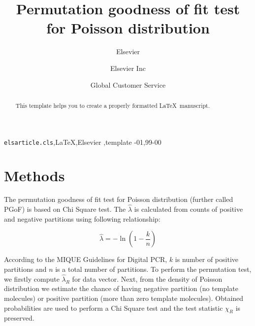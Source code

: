 \documentclass[review]{elsarticle}
\begin{document}
\begin{frontmatter}

\title{Permutation goodness of fit test for Poisson distribution}

\author{Elsevier}
\address{Radarweg 29, Amsterdam}

\author[mymainaddress,mysecondaryaddress]{Elsevier Inc}

\author[mysecondaryaddress]{Global Customer Service}

\address[mymainaddress]{1600 John F Kennedy Boulevard, Philadelphia}
\address[mysecondaryaddress]{360 Park Avenue South, New York}

\begin{abstract}
This template helps you to create a properly formatted \LaTeX\ manuscript.
\end{abstract}

\begin{keyword}
\texttt{elsarticle.cls}\sep \LaTeX\sep Elsevier \sep template
-01\sep  99-00
\end{keyword}

\end{frontmatter}

\linenumbers


\section{Methods}

The permutation goodness of fit test for Poisson distribution (further called PGoF) is based on Chi Square test. The $\hat\lambda$ is calculated from counts of positive and negative partitions using following relationship:

\begin{equation}
\hat{\lambda} = - \ln \left(1 - \frac{k}{n} \right)
\end{equation}

According to the MIQUE Guidelines for Digital PCR, $k$ is number of positive partitions and $n$ is a total number of partitions. To perform the permutation test, we firstly compute $\hat\lambda_R$ for data vector. Next, from the density of Poisson distribution we estimate the chance of having negative partition (no template molecules) or positive partition (more than zero template molecules). Obtained probabilities are used to perform a Chi Square test and the test statistic $\chi_R$ is preserved.
\end{document}

